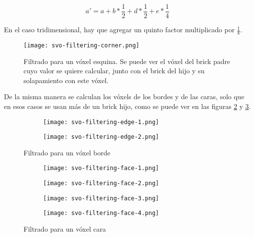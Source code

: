 $$
a' = a + b * \frac{1}{2} + d * \frac{1}{2} + e * \frac{1}{4}
$$

En el caso tridimensional, hay que agregar un quinto factor multiplicado por $\frac{1}{8}$.


\begin{figure}
    \centering
    \texttt{[image: svo-filtering-corner.png]}
    \caption{
        Filtrado para un vóxel esquina.
        Se puede ver el vóxel del brick padre cuyo valor se quiere calcular, junto con el brick del hijo y su solapamiento con este vóxel.
    }
    \label{fig:svo_filtering_corners}
\end{figure}

De la misma manera se calculan los vóxels de los bordes y de las caras, solo que en esos casos se usan más de un brick hijo, como se puede ver en las figuras \ref{fig:svo_filtering_edges} y \ref{fig:svo_filtering_faces}.

\begin{figure}
    \begin{center}
        \begin{subfigure}{.24\textwidth}
            \texttt{[image: svo-filtering-edge-1.png]}
        \end{subfigure}
        \begin{subfigure}{.24\textwidth}
            \texttt{[image: svo-filtering-edge-2.png]}
        \end{subfigure}
    \end{center}
    \caption{Filtrado para un vóxel borde}
    \label{fig:svo_filtering_edges}
\end{figure}

\begin{figure}
    \begin{center}
        \begin{subfigure}{.24\textwidth}
            \texttt{[image: svo-filtering-face-1.png]}
        \end{subfigure}
        \begin{subfigure}{.24\textwidth}
            \texttt{[image: svo-filtering-face-2.png]}
        \end{subfigure}
        \begin{subfigure}{.24\textwidth}
            \texttt{[image: svo-filtering-face-3.png]}
        \end{subfigure}
        \begin{subfigure}{.24\textwidth}
            \texttt{[image: svo-filtering-face-4.png]}
        \end{subfigure}
    \end{center}
    \caption{Filtrado para un vóxel cara}
    \label{fig:svo_filtering_faces}
\end{figure}

